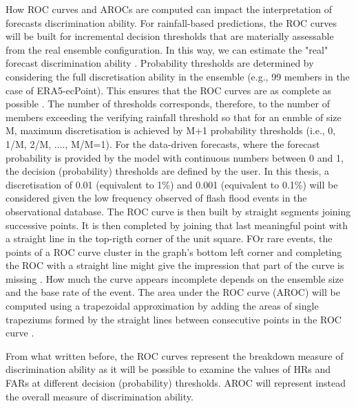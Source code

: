 How ROC curves and AROCs are computed can impact the interpretation of forecasts discrimination ability. For rainfall-based predictions, the ROC curves will be built for incremental decision thresholds that are materially assessable from the real ensemble configuration. In this way, we can estimate the "real" forecast discrimination ability \citep{wilks_statistical_2020}. Probability thresholds are determined by considering the full discretisation ability in the ensemble (e.g., 99 members in the case of ERA5-ecPoint). This ensures that the ROC curves are as complete as possible \citep{Bouallegue_2022}. The number of thresholds corresponds, therefore, to the number of members exceeding the verifying rainfall threshold so that for an enmble of size M, maximum discretisation is achieved by M+1 probability thresholds (i.e., 0, 1/M, 2/M, ...., M/M=1). For the data-driven forecasts, where the forecast probability is provided by the model with continuous numbers between 0 and 1, the decision (probability) thresholds are defined by the user. In this thesis, a discretisation of 0.01 (equivalent to 1\%) and 0.001 (equivalent to 0.1\%) will be considered given the low frequency observed of flash flood events in the observational database. The ROC curve is then built by straight segments joining successive points. It is then completed by joining that last meaningful point with a straight line in the top-rigth corner of the unit square. FOr rare events, the points of a ROC curve cluster in the graph's bottom left corner and completing the ROC with a straight line might give the impression that part of the curve is missing \citep{Casati_2008}. How much the curve appears incomplete depends on the ensemble size and the base rate of the event. The area under the ROC curve (AROC) will be computed using a trapezoidal approximation by adding the areas of single trapeziums formed by the straight lines between consecutive points in the ROC curve \citep{Bouallegue_2022}. 

From what written before, the ROC curves represent the breakdown measure of discrimination ability as it will be possible to examine the values of HRs and FARs at different decision (probability) thresholds. AROC will represent instead the overall measure of discrimination ability.

